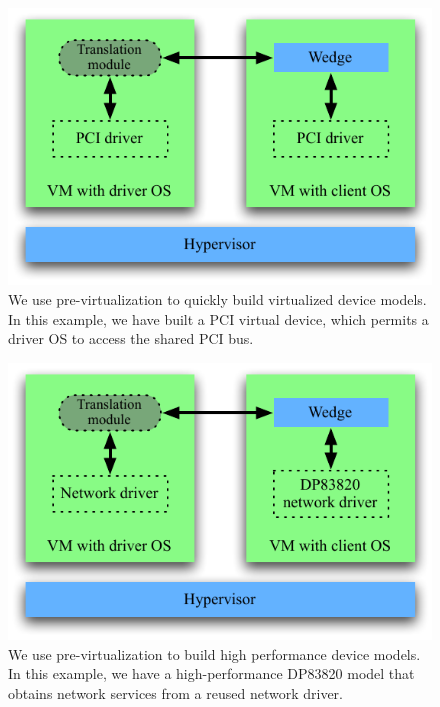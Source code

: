 \documentclass[10pt,a4paper]{article}
\begin{document}
\begin{figure}[tb]
  \centering
  \includegraphics{figures/previrtualized-PCI.pdf}
  \caption[Reused PCI driver with a pre-virtualized client OS.]{We use
  pre-virtualization to quickly build virtualized device models.  In this
  example, we have built a PCI virtual device, which permits a driver
  OS to access the shared PCI bus.}
  \label{fig:previrtualized_PCI}
\end{figure}


\begin{figure}[tb]
  \centering
  \includegraphics{figures/previrtualized-network.pdf}
  \caption[Reused drivers with a pre-virtualized client OS.]{We use
  pre-virtualization to build high performance device models.  In this
  example, we have a high-performance DP83820 model that obtains
  network services from a reused network driver.}
  \label{fig:previrtualized_network}
\end{figure}
\end{document}
